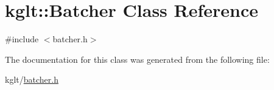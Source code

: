 \hypertarget{classkglt_1_1_batcher}{\section{kglt\-:\-:Batcher Class Reference}
\label{classkglt_1_1_batcher}
}


{\ttfamily \#include $<$batcher.\-h$>$}



The documentation for this class was generated from the following file\-:\begin{DoxyCompactItemize}
\item 
kglt/\hyperlink{batcher_8h}{batcher.\-h}\end{DoxyCompactItemize}
